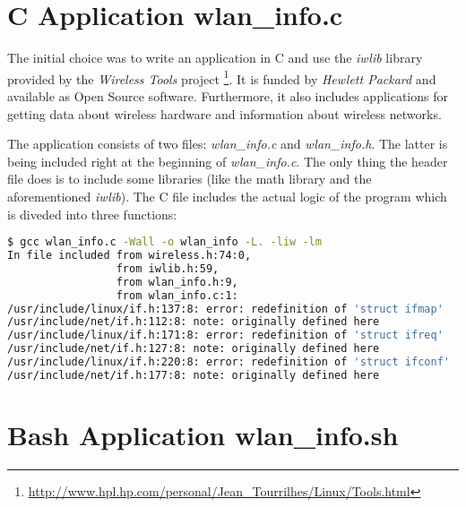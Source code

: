 \section{C Application wlan\_info.c}

The initial choice was to write an application in C and use the \textit{iwlib} library provided by the \textit{Wireless Tools} project \footnote{\url{http://www.hpl.hp.com/personal/Jean_Tourrilhes/Linux/Tools.html}}. It is funded by \textit{Hewlett Packard} and available as Open Source software. Furthermore, it also includes applications for getting data about wireless hardware and information about wireless networks.

The application consists of two files: \textit{wlan\_info.c} and \textit{wlan\_info.h}. The latter is being included right at the beginning of \textit{wlan\_info.c}. The only thing the header file does is to include some libraries (like the math library and the aforementioned \textit{iwlib}). The C file includes the actual logic of the program which is diveded into three functions: 



\begin{lstlisting}[language=bash]
$ gcc wlan_info.c -Wall -o wlan_info -L. -liw -lm
In file included from wireless.h:74:0,
                 from iwlib.h:59,
                 from wlan_info.h:9,
                 from wlan_info.c:1:
/usr/include/linux/if.h:137:8: error: redefinition of 'struct ifmap'
/usr/include/net/if.h:112:8: note: originally defined here
/usr/include/linux/if.h:171:8: error: redefinition of 'struct ifreq'
/usr/include/net/if.h:127:8: note: originally defined here
/usr/include/linux/if.h:220:8: error: redefinition of 'struct ifconf'
/usr/include/net/if.h:177:8: note: originally defined here
\end{lstlisting}


\section{Bash Application wlan\_info.sh}

